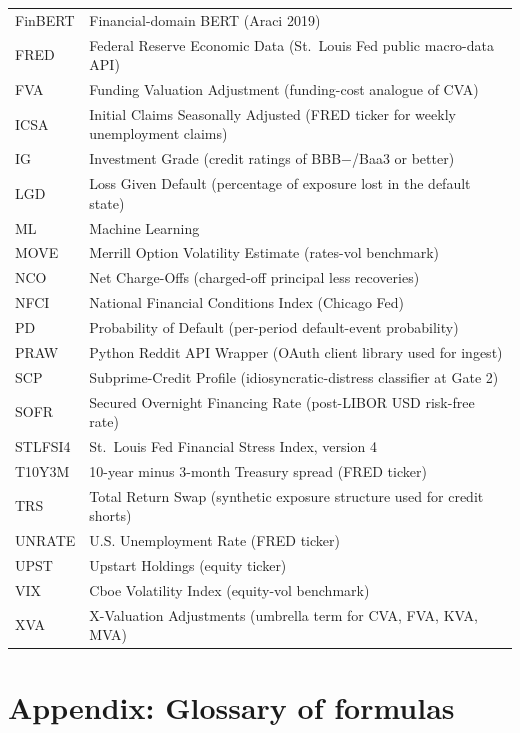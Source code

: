 \documentclass[11pt,a4paper]{article}
\begin{document}
\begin{longtable}{@{}lp{11cm}@{}}
FinBERT     & Financial-domain BERT (Araci 2019) \\
FRED        & Federal Reserve Economic Data (St.~Louis Fed public macro-data API) \\
FVA         & Funding Valuation Adjustment (funding-cost analogue of CVA) \\
ICSA        & Initial Claims Seasonally Adjusted (FRED ticker for weekly unemployment claims) \\
IG          & Investment Grade (credit ratings of BBB$-$/Baa3 or better) \\
LGD         & Loss Given Default (percentage of exposure lost in the default state) \\
ML          & Machine Learning \\
MOVE        & Merrill Option Volatility Estimate (rates-vol benchmark) \\
NCO         & Net Charge-Offs (charged-off principal less recoveries) \\
NFCI        & National Financial Conditions Index (Chicago Fed) \\
PD          & Probability of Default (per-period default-event probability) \\
PRAW        & Python Reddit API Wrapper (OAuth client library used for ingest) \\
SCP         & Subprime-Credit Profile (idiosyncratic-distress classifier at Gate 2) \\
SOFR        & Secured Overnight Financing Rate (post-LIBOR USD risk-free rate) \\
STLFSI4     & St.~Louis Fed Financial Stress Index, version 4 \\
T10Y3M      & 10-year minus 3-month Treasury spread (FRED ticker) \\
TRS         & Total Return Swap (synthetic exposure structure used for credit shorts) \\
UNRATE      & U.S. Unemployment Rate (FRED ticker) \\
UPST        & Upstart Holdings (equity ticker) \\
VIX         & Cboe Volatility Index (equity-vol benchmark) \\
XVA         & X-Valuation Adjustments (umbrella term for CVA, FVA, KVA, MVA) \\
\bottomrule
\end{longtable}

\section{Appendix: Glossary of formulas}
\end{document}
